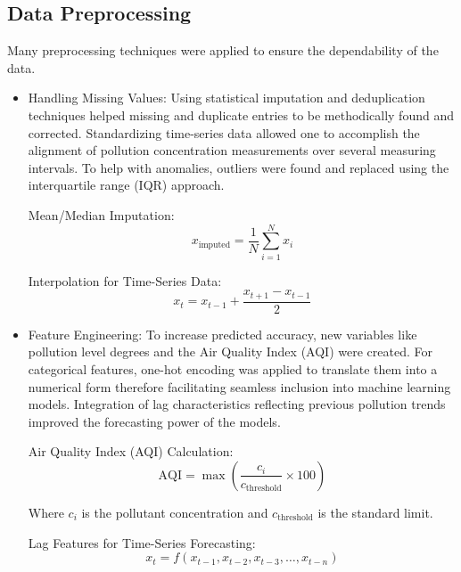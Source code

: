 \documentclass[conference]{IEEEtran}
\begin{document}
\subsection{Data Preprocessing}\label{AA}
Many preprocessing techniques were applied to ensure the dependability of the data.
\begin{itemize}
    \item Handling Missing Values: Using statistical imputation and deduplication techniques helped missing and duplicate entries to be methodically found and corrected. Standardizing time-series data allowed one to accomplish the alignment of pollution concentration measurements over several measuring intervals. To help with anomalies, outliers were found and replaced using the interquartile range (IQR) approach. 

    \vspace{10pt}
    Mean/Median Imputation:
    \begin{equation}
    x_{\text{imputed}} = \frac{1}{N} \sum_{i=1}^{N} x_i \tag{1}
    \end{equation}

    \vspace{10pt}
    Interpolation for Time-Series Data:
    \begin{equation}
    x_t = x_{t-1} + \frac{x_{t+1} - x_{t-1}}{2} \tag{2}
    \end{equation}

    \item Feature Engineering: To increase predicted accuracy, new variables like pollution level degrees and the Air Quality Index (AQI) were created. For categorical features, one-hot encoding was applied to translate them into a numerical form therefore facilitating seamless inclusion into machine learning models. Integration of lag characteristics reflecting previous pollution trends improved the forecasting power of the models. 

    \vspace{10pt}
    Air Quality Index (AQI) Calculation:
    \begin{equation}
    \text{AQI} = \max \left( \frac{c_i}{c_{\text{threshold}}} \times 100 \right) \tag{3}
    \end{equation}
    
    Where \( c_i \) is the pollutant concentration and \( c_{\text{threshold}} \) is the standard limit.
    
    \vspace{10pt}
    Lag Features for Time-Series Forecasting:
    \begin{equation}
    x_t = f \left( x_{t-1}, x_{t-2}, x_{t-3}, \dots, x_{t-n} \right) \tag{4}
    \end{equation}


\end{itemize}
\end{document}
